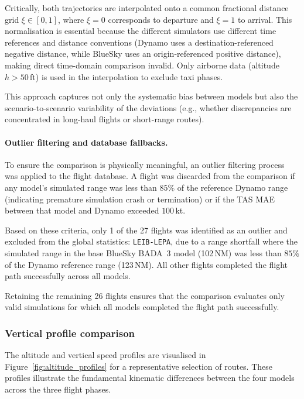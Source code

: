 Critically, both trajectories are interpolated onto a common fractional distance grid $\xi \in [0, 1]$, where $\xi = 0$ corresponds to departure and $\xi = 1$ to arrival. This normalisation is essential because the different simulators use different time references and distance conventions (Dynamo uses a destination-referenced negative distance, while BlueSky uses an origin-referenced positive distance), making direct time-domain comparison invalid. Only airborne data (altitude $h > 50$\,ft) is used in the interpolation to exclude taxi phases.

This approach captures not only the systematic bias between models but also the scenario-to-scenario variability of the deviations (e.g., whether discrepancies are concentrated in long-haul flights or short-range routes).

\paragraph{Outlier filtering and database fallbacks.}
To ensure the comparison is physically meaningful, an outlier filtering process was applied to the flight database. A flight was discarded from the comparison if any model's simulated range was less than $85\%$ of the reference Dynamo range (indicating premature simulation crash or termination) or if the TAS MAE between that model and Dynamo exceeded $100$\,kt.

Based on these criteria, only 1 of the 27 flights was identified as an outlier and excluded from the global statistics: \texttt{LEIB-LEPA}, due to a range shortfall where the simulated range in the base BlueSky BADA~3 model (102\,NM) was less than $85\%$ of the Dynamo reference range (123\,NM). All other flights completed the flight path successfully across all models.

Retaining the remaining 26 flights ensures that the comparison evaluates only valid simulations for which all models completed the flight path successfully.

\subsubsection{Vertical profile comparison}

The altitude and vertical speed profiles are visualised in Figure~\ref{fig:altitude_profiles} for a representative selection of routes. These profiles illustrate the fundamental kinematic differences between the four models across the three flight phases.

